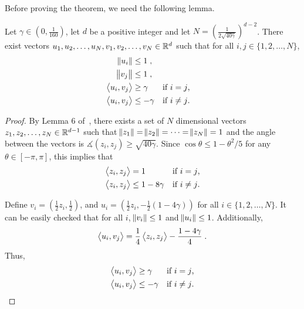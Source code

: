 Before proving the theorem, we need the following lemma.

\begin{lemma}
\label{lemma:embed_d_gamma}
Let $\gamma \in (0,\frac{1}{160})$, let $d$ be a positive integer and let $N = (\frac{1}{2\sqrt{40\gamma}})^{d-2}$.
There exist vectors $u_1, u_2, \dots, u_N, v_1, v_2, \dots, v_N \in \mathbb{R}^d$ such that for all $i, j \in \{1,2,\dots,N\}$,
\begin{align*}
\norm{u_i} & \le 1 \; , \\
\norm{v_j} & \le 1 \; , \\
\left\langle u_i, v_j \right\rangle & \ge \gamma & & \text{if $i=j$,} \\
\left\langle u_i, v_j \right\rangle & \le -\gamma & & \text{if $i \neq j$.}
\end{align*}
\end{lemma}

\begin{proof}
By Lemma 6 of~\citet{Long-1995}, there exists a set of $N$ dimensional vectors
$z_1, z_2, \dots, z_N \in \mathbb{R}^{d-1}$ such that $\norm{z_1} = \norm{z_2} = \dots =
\norm{z_N} = 1$ and the angle between the vectors is $\measuredangle(z_i, z_j) \ge
\sqrt{40 \gamma}$. Since $\cos\theta \le 1-\theta^2/5$ for any $\theta \in
[-\pi,\pi]$, this implies that
\begin{align*}
\left\langle z_i, z_j \right\rangle &= 1 && \text{if $i = j$,} \\
\left\langle z_i, z_j \right\rangle &\le 1 - 8\gamma && \text{if $i \neq j$.}
\end{align*}

Define $v_i = (\frac12 z_i, \frac12)$, and $u_i = (\frac{1}{2} z_i, -\frac{1}{2}(1-4\gamma))$ for all $i \in \{1,2,\dots,N\}$.
It can be easily checked that for all $i$,
$\norm{v_i} \le 1$ and $\norm{u_i} \le 1$. Additionally,
$$
\left\langle u_i, v_j \right\rangle = \frac{1}{4} \left\langle z_i, z_j \right\rangle - \frac {1-4\gamma} 4 \; .
$$
Thus,
\begin{align*}
\left\langle u_i, v_j \right\rangle &\ge \gamma && \text{if $i=j$,} \\
\left\langle u_i, v_j \right\rangle &\le -\gamma && \text{if $i \neq j$.}
\end{align*}
\end{proof}

